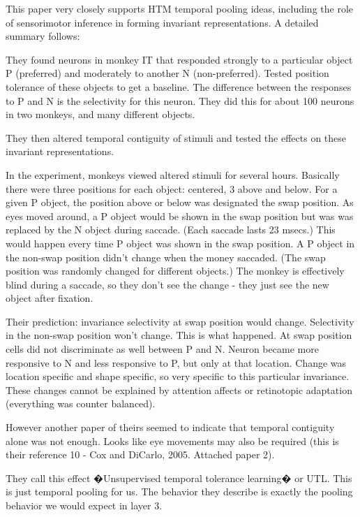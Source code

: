 \documentclass{article} %
\begin{document}
This paper \cite{Li2008} very closely supports HTM temporal pooling ideas,
including the role of sensorimotor inference in forming invariant
representations.  A detailed summary follows:

They found neurons in monkey IT that responded strongly to a particular object
P (preferred) and moderately to another N (non-preferred). Tested position
tolerance of these objects to get a baseline.  The difference between the
responses to P and N is the selectivity for this neuron.  They did this
for about 100 neurons in two monkeys, and many different objects.

They then altered temporal contiguity of stimuli and tested the effects on these
invariant representations.



In the experiment, monkeys viewed altered stimuli for several hours. Basically
there were three positions for each object: centered, 3 above and below. For a
given P object, the position above or below was designated the swap position.
As eyes moved around, a P object would be shown in the swap position but was was
replaced by the N object during saccade. (Each saccade lasts 23 msecs.) This
would happen every time P object was shown in the swap position.  A P object in
the non-swap position didn't change when the money saccaded. (The swap position
was randomly changed for different objects.)  The monkey is effectively blind
during a saccade, so they don't see the change - they just see the new object
after fixation.

Their prediction: invariance selectivity at swap position would change.
Selectivity in the non-swap position won't change.  This is what happened. At
swap position cells did not discriminate as well between P and N. Neuron became
more responsive to N and less responsive to P, but only at that location. Change
was location specific and shape specific, so very specific to this particular
invariance. These changes cannot be explained by attention affects or
retinotopic adaptation (everything was counter balanced).

However another paper of theirs seemed to indicate that temporal contiguity
alone was not enough. Looks like eye movements may also be required (this is
their reference 10 - Cox and DiCarlo, 2005. Attached paper 2).

They call this effect �Unsupervised temporal tolerance learning� or UTL. This is
just temporal pooling for us.  The behavior they describe is exactly the pooling
behavior we would expect in layer 3.
\end{document}
